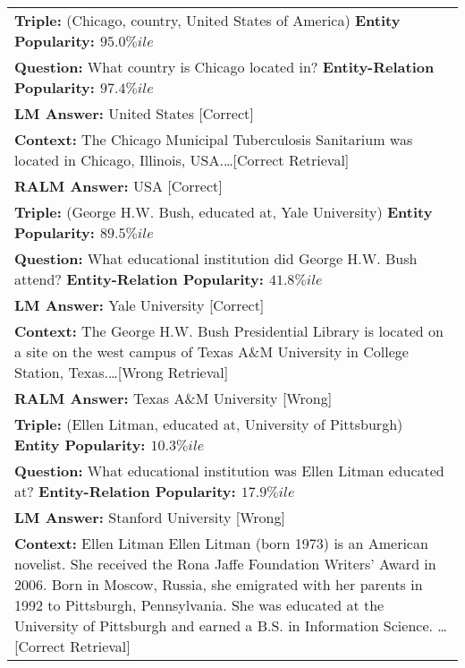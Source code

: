 \newcommand{\crimson}{red}
\newcommand{\darkgreen}{green}

\begin{table*}[!htb]
    \centering
    \scriptsize
    \begin{tabular}{p{15.5cm}}
        \toprule
        \textbf{Triple: }(Chicago, country, United States of America) \hfill \textbf{Entity Popularity: $95.0\%ile$}\\
        \textbf{Question:} What country is Chicago located in? \hfill\textbf{Entity-Relation Popularity: $97.4\%ile$}\\ %
        \textbf{LM Answer:} United States {\color{\darkgreen}[Correct]}\\
        \textbf{Context: } The Chicago Municipal Tuberculosis Sanitarium was located in Chicago, Illinois, USA.\dots{\color{\darkgreen}[Correct Retrieval]}\\
        \textbf{RALM Answer:} USA {\color{\darkgreen}[Correct]}\\\midrule
        \textbf{Triple: }(George H.W. Bush, educated at, Yale University) \hfill \textbf{Entity Popularity: $89.5\%ile$}\\
        \textbf{Question:} What educational institution did George H.W. Bush attend? \hfill \textbf{Entity-Relation Popularity: $41.8\%ile$}\\%
        \textbf{LM Answer:} Yale University {\color{\darkgreen}[Correct]}\\
        \textbf{Context: } The George H.W. Bush Presidential Library is located on a site on the west campus of Texas A\&M University in College Station, Texas.\dots {\color{\crimson}[Wrong Retrieval]}\\
        \textbf{RALM Answer:} Texas A\&M University {\color{\crimson}[Wrong]}\\\midrule
        \textbf{Triple: }(Ellen Litman, educated at, University of Pittsburgh) \hfill \textbf{Entity Popularity: $10.3\%ile$}\\
        \textbf{Question:} What educational institution was Ellen Litman educated at? \hfill \textbf{Entity-Relation Popularity: $17.9\%ile$} \\ %
        \textbf{LM Answer:} Stanford University {\color{\crimson}[Wrong]} \\
        \textbf{Context: } Ellen Litman Ellen Litman (born 1973) is an American novelist. She received the Rona Jaffe Foundation Writers' Award in 2006. Born in Moscow, Russia, she emigrated with her parents in 1992 to Pittsburgh, Pennsylvania. She was educated at the University of Pittsburgh and earned a B.S. in Information Science. \dots{\color{\darkgreen}[Correct Retrieval]}\\

\end{tabular}
\end{table*}
